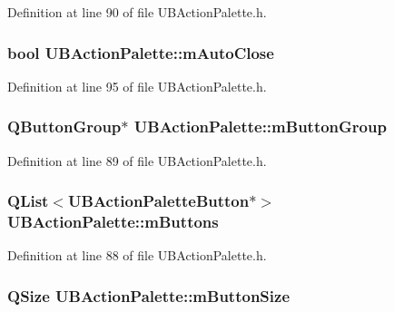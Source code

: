 Definition at line 90 of file U\-B\-Action\-Palette.\-h.

\hypertarget{class_u_b_action_palette_af2223114a8714b10a9bcb0289a7e133e}{
\subsubsection[{m\-Auto\-Close}]{\setlength{\rightskip}{0pt plus 5cm}bool U\-B\-Action\-Palette\-::m\-Auto\-Close\hspace{0.3cm}{\ttfamily [protected]}}}\label{de/dc5/class_u_b_action_palette_af2223114a8714b10a9bcb0289a7e133e}


Definition at line 95 of file U\-B\-Action\-Palette.\-h.

\hypertarget{class_u_b_action_palette_abee5fd5d774e46838952b4632add4e46}{
\subsubsection[{m\-Button\-Group}]{\setlength{\rightskip}{0pt plus 5cm}Q\-Button\-Group$\ast$ U\-B\-Action\-Palette\-::m\-Button\-Group\hspace{0.3cm}{\ttfamily [protected]}}}\label{de/dc5/class_u_b_action_palette_abee5fd5d774e46838952b4632add4e46}


Definition at line 89 of file U\-B\-Action\-Palette.\-h.

\hypertarget{class_u_b_action_palette_a533f91782bfb170d961413b39671ed03}{
\subsubsection[{m\-Buttons}]{\setlength{\rightskip}{0pt plus 5cm}Q\-List$<${\bf U\-B\-Action\-Palette\-Button}$\ast$$>$ U\-B\-Action\-Palette\-::m\-Buttons\hspace{0.3cm}{\ttfamily [protected]}}}\label{de/dc5/class_u_b_action_palette_a533f91782bfb170d961413b39671ed03}


Definition at line 88 of file U\-B\-Action\-Palette.\-h.

\hypertarget{class_u_b_action_palette_aa9169370f744833ae9b9d2e67d600ccc}{
\subsubsection[{m\-Button\-Size}]{\setlength{\rightskip}{0pt plus 5cm}Q\-Size U\-B\-Action\-Palette\-::m\-Button\-Size\hspace{0.3cm}{\ttfamily [protected]}}}\label{de/dc5/class_u_b_action_palette_aa9169370f744833ae9b9d2e67d600ccc}


